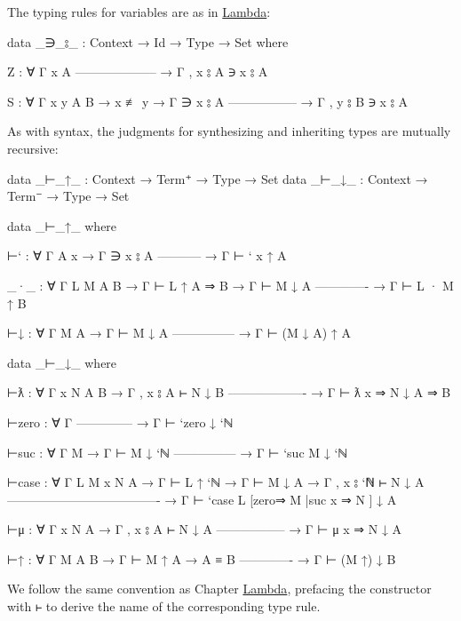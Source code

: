 The typing rules for variables are as in
\protect\hyperlink{Lambda}{Lambda}:

\begin{fence}
\begin{code}
data _∋_⦂_ : Context → Id → Type → Set where

  Z : ∀ {Γ x A}
      --------------------
    → Γ , x ⦂ A ∋ x ⦂ A

  S : ∀ {Γ x y A B}
    → x ≢ y
    → Γ ∋ x ⦂ A
      -----------------
    → Γ , y ⦂ B ∋ x ⦂ A
\end{code}
\end{fence}

As with syntax, the judgments for synthesizing and inheriting types are
mutually recursive:

\begin{fence}
\begin{code}
data _⊢_↑_ : Context → Term⁺ → Type → Set
data _⊢_↓_ : Context → Term⁻ → Type → Set

data _⊢_↑_ where

  ⊢` : ∀ {Γ A x}
    → Γ ∋ x ⦂ A
      -----------
    → Γ ⊢ ` x ↑ A

  _·_ : ∀ {Γ L M A B}
    → Γ ⊢ L ↑ A ⇒ B
    → Γ ⊢ M ↓ A
      -------------
    → Γ ⊢ L · M ↑ B

  ⊢↓ : ∀ {Γ M A}
    → Γ ⊢ M ↓ A
      ---------------
    → Γ ⊢ (M ↓ A) ↑ A

data _⊢_↓_ where

  ⊢ƛ : ∀ {Γ x N A B}
    → Γ , x ⦂ A ⊢ N ↓ B
      -------------------
    → Γ ⊢ ƛ x ⇒ N ↓ A ⇒ B

  ⊢zero : ∀ {Γ}
      --------------
    → Γ ⊢ `zero ↓ `ℕ

  ⊢suc : ∀ {Γ M}
    → Γ ⊢ M ↓ `ℕ
      ---------------
    → Γ ⊢ `suc M ↓ `ℕ

  ⊢case : ∀ {Γ L M x N A}
    → Γ ⊢ L ↑ `ℕ
    → Γ ⊢ M ↓ A
    → Γ , x ⦂ `ℕ ⊢ N ↓ A
      -------------------------------------
    → Γ ⊢ `case L [zero⇒ M |suc x ⇒ N ] ↓ A

  ⊢μ : ∀ {Γ x N A}
    → Γ , x ⦂ A ⊢ N ↓ A
      -----------------
    → Γ ⊢ μ x ⇒ N ↓ A

  ⊢↑ : ∀ {Γ M A B}
    → Γ ⊢ M ↑ A
    → A ≡ B
      -------------
    → Γ ⊢ (M ↑) ↓ B
\end{code}
\end{fence}

We follow the same convention as Chapter
\protect\hyperlink{Lambda}{Lambda}, prefacing the constructor with
\texttt{⊢} to derive the name of the corresponding type rule.

